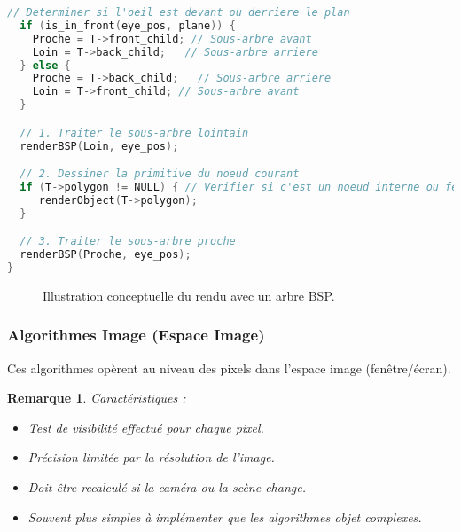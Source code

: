 \documentclass{article}
\newtheorem{remark}{Remarque}
\begin{document}
{\begin{lstlisting}[language=C, caption={Pseudo-code du rendu avec un arbre BSP}, label=lst:bsp_render, breaklines=true]
  // Determiner si l'oeil est devant ou derriere le plan
  if (is_in_front(eye_pos, plane)) {
    Proche = T->front_child; // Sous-arbre avant
    Loin = T->back_child;   // Sous-arbre arriere
  } else {
    Proche = T->back_child;   // Sous-arbre arriere
    Loin = T->front_child; // Sous-arbre avant
  }

  // 1. Traiter le sous-arbre lointain
  renderBSP(Loin, eye_pos);

  // 2. Dessiner la primitive du noeud courant
  if (T->polygon != NULL) { // Verifier si c'est un noeud interne ou feuille avec polygone
     renderObject(T->polygon);
  }

  // 3. Traiter le sous-arbre proche
  renderBSP(Proche, eye_pos);
}
\end{lstlisting}

\begin{figure}[H]
    \centering
    \caption{Illustration conceptuelle du rendu avec un arbre BSP.}
    \label{fig:bsp_render_seq}
\end{figure}


\subsubsection{Algorithmes Image (Espace Image)}
Ces algorithmes opèrent au niveau des pixels dans l'espace image (fenêtre/écran).

\begin{remark}
Caractéristiques :
\begin{itemize}
    \item Test de visibilité effectué pour chaque pixel.
    \item Précision limitée par la résolution de l'image.
    \item Doit être recalculé si la caméra ou la scène change.
    \item Souvent plus simples à implémenter que les algorithmes objet complexes.
\end{itemize}
\end{remark}

}
\end{document}

